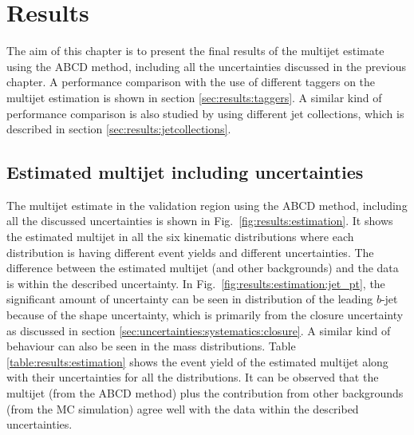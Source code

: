 
\chapter{Results}
\label{sec:results}
The aim of this chapter is to present the final results of the multijet estimate using the ABCD method, including all the uncertainties discussed in the previous chapter. A performance comparison with the use of different taggers on the multijet estimation is shown in section \ref{sec:results:taggers}. A similar kind of performance comparison is also studied by using different jet collections, which is described in section \ref{sec:results:jetcollections}.
 
\section{Estimated multijet including uncertainties}
\label{sec:results:estimation}
The multijet estimate in the validation region using the ABCD method, including all the discussed uncertainties is shown in Fig.\ \ref{fig:results:estimation}. It shows the estimated multijet in all the six kinematic distributions where each distribution is having different event yields and different uncertainties. The difference between the estimated multijet (and other backgrounds) and the data is within the described uncertainty. In Fig.\ \ref{fig:results:estimation:jet_pt}, the significant amount of uncertainty can be seen in \pt distribution of the leading $b$-jet because of the shape uncertainty, which is primarily from the closure uncertainty as discussed in section \ref{sec:uncertainties:systematics:closure}. A similar kind of behaviour can also be seen in the mass distributions. Table \ref{table:results:estimation} shows the event yield of the estimated multijet along with their uncertainties for all the distributions. It can be observed that the multijet (from the ABCD method) plus the contribution from other backgrounds (from the MC simulation) agree well with the data within the described uncertainties.

